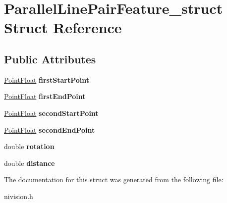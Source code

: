 \hypertarget{structParallelLinePairFeature__struct}{
\section{ParallelLinePairFeature\_\-struct Struct Reference}
\label{structParallelLinePairFeature__struct}
}
\subsection*{Public Attributes}
\begin{DoxyCompactItemize}
\item 
\hypertarget{structParallelLinePairFeature__struct_a6d8dd34b5b675563f4f2e4f9911769d8}{
\hyperlink{structPointFloat__struct}{PointFloat} {\bfseries firstStartPoint}}
\label{structParallelLinePairFeature__struct_a6d8dd34b5b675563f4f2e4f9911769d8}

\item 
\hypertarget{structParallelLinePairFeature__struct_a6f2ded74cab270909e7138b3b23da21e}{
\hyperlink{structPointFloat__struct}{PointFloat} {\bfseries firstEndPoint}}
\label{structParallelLinePairFeature__struct_a6f2ded74cab270909e7138b3b23da21e}

\item 
\hypertarget{structParallelLinePairFeature__struct_ac6cb3ecd1adb9b7972bfe750cfaf0ccb}{
\hyperlink{structPointFloat__struct}{PointFloat} {\bfseries secondStartPoint}}
\label{structParallelLinePairFeature__struct_ac6cb3ecd1adb9b7972bfe750cfaf0ccb}

\item 
\hypertarget{structParallelLinePairFeature__struct_add08226e9b3cad3938ef6ebf8fb46fb7}{
\hyperlink{structPointFloat__struct}{PointFloat} {\bfseries secondEndPoint}}
\label{structParallelLinePairFeature__struct_add08226e9b3cad3938ef6ebf8fb46fb7}

\item 
\hypertarget{structParallelLinePairFeature__struct_addc9c2a4f6e9ab97ccb7d1c99cb10b98}{
double {\bfseries rotation}}
\label{structParallelLinePairFeature__struct_addc9c2a4f6e9ab97ccb7d1c99cb10b98}

\item 
\hypertarget{structParallelLinePairFeature__struct_aaa2d418ffacb9fd5ffc56badd6a28709}{
double {\bfseries distance}}
\label{structParallelLinePairFeature__struct_aaa2d418ffacb9fd5ffc56badd6a28709}

\end{DoxyCompactItemize}


The documentation for this struct was generated from the following file:\begin{DoxyCompactItemize}
\item 
nivision.h\end{DoxyCompactItemize}

